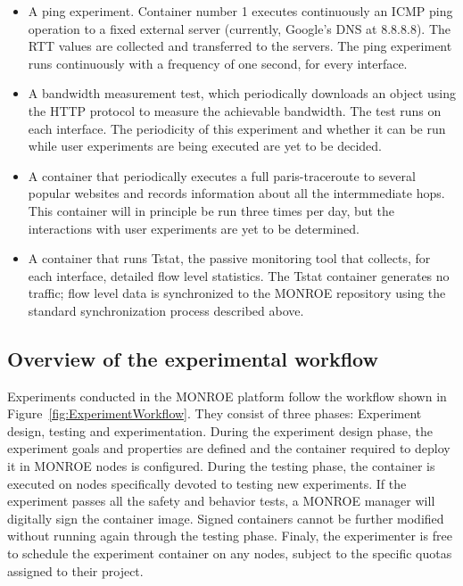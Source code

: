\documentclass[a4paper,10pt]{article}
\newcommand{\monroe}{MONROE}
\begin{document}
\begin{itemize}
\begin{itemize}
		\item A ping experiment. Container number \num{1} executes continuously an ICMP ping operation to a fixed external server (currently, Google's DNS at 8.8.8.8). The RTT values are collected and transferred to the servers. The ping experiment runs continuously with a frequency of one second, for every interface.
		\item A bandwidth measurement test, which periodically downloads an object using the HTTP protocol to measure the achievable bandwidth. The test runs on each interface. The periodicity of this experiment and whether it can be run while user experiments are being executed are yet to be decided.
		\item A container that periodically executes a full paris-traceroute to several popular websites and records information about all the intermmediate hops. This container will in principle be run three times per day, but the interactions with user experiments are yet to be determined.
		\item A container that runs Tstat, the passive monitoring tool that collects, for each interface, detailed flow level statistics. The Tstat container generates no traffic; flow level data is synchronized to the \monroe{} repository using the standard synchronization process described above.
	\end{itemize}
\end{itemize}

\subsection{Overview of the experimental workflow}

Experiments conducted in the \monroe{} platform follow the workflow shown in Figure~\ref{fig:ExperimentWorkflow}.
They consist of three phases: Experiment design, testing and experimentation.
During the experiment design phase, the experiment goals and properties are defined and the container required to deploy it in \monroe{} nodes is configured.
During the testing phase, the container is executed on nodes specifically devoted to testing new experiments.
If the experiment passes all the safety and behavior tests, a \monroe{} manager will digitally sign the container image.
Signed containers cannot be further modified without running again through the testing phase.
Finaly, the experimenter is free to schedule the experiment container on any nodes, subject to the specific quotas assigned to their project.
\end{document}
